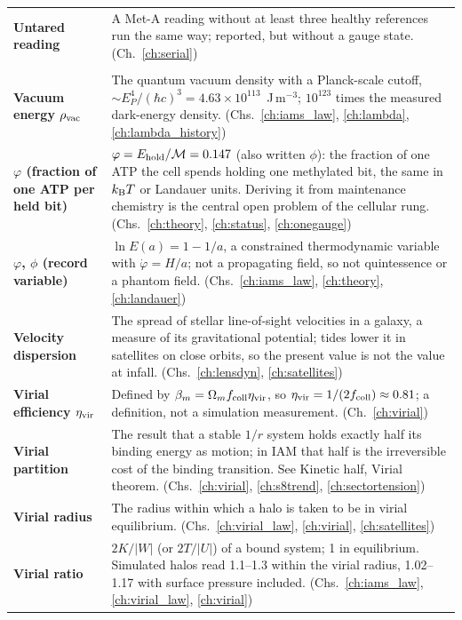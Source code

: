 {\begin{longtable}{@{}>{\raggedright\arraybackslash}p{}>{\raggedright\arraybackslash}p{}@{}}
\textbf{Untared reading} & A Met-A reading without at least three healthy references run the same way; reported, but without a gauge state. {\footnotesize(Ch.~\ref{ch:serial})}\\[1pt]
\multicolumn{2}{@{}l}{\normalsize\textbf{V}}\\[2pt]
\textbf{Vacuum energy $\rho_{\rm vac}$} & The quantum vacuum density with a Planck-scale cutoff, $\sim E_P^4/(\hbar c)^3=4.63\times10^{113}$~J\,m$^{-3}$; $10^{123}$ times the measured dark-energy density. {\footnotesize(Chs.~\ref{ch:iams_law}, \ref{ch:lambda}, \ref{ch:lambda_history})}\\[1pt]
\textbf{$\varphi$ (fraction of one ATP per held bit)} & $\varphi=E_{\rm hold}/\mathcal M=0.147$ (also written $\phi$): the fraction of one ATP the cell spends holding one methylated bit, the same in $k_{\mathrm B} T$ or Landauer units. Deriving it from maintenance chemistry is the central open problem of the cellular rung. {\footnotesize(Chs.~\ref{ch:theory}, \ref{ch:status}, \ref{ch:onegauge})}\\[1pt]
\textbf{$\varphi$, $\phi$ (record variable)} & $\ln E(a)=1-1/a$, a constrained thermodynamic variable with $\dot\varphi=H/a$; not a propagating field, so not quintessence or a phantom field. {\footnotesize(Chs.~\ref{ch:iams_law}, \ref{ch:theory}, \ref{ch:landauer})}\\[1pt]
\textbf{Velocity dispersion} & The spread of stellar line-of-sight velocities in a galaxy, a measure of its gravitational potential; tides lower it in satellites on close orbits, so the present value is not the value at infall. {\footnotesize(Chs.~\ref{ch:lensdyn}, \ref{ch:satellites})}\\[1pt]
\textbf{Virial efficiency $\eta_{\rm vir}$} & Defined by $\beta_m=\Omega_mf_{\rm coll}\eta_{\rm vir}$, so $\eta_{\rm vir}=1/(2f_{\rm coll})\approx0.81$; a definition, not a simulation measurement. {\footnotesize(Ch.~\ref{ch:virial})}\\[1pt]
\textbf{Virial partition} & The result that a stable $1/r$ system holds exactly half its binding energy as motion; in IAM that half is the irreversible cost of the binding transition. See Kinetic half, Virial theorem. {\footnotesize(Chs.~\ref{ch:virial}, \ref{ch:s8trend}, \ref{ch:sectortension})}\\[1pt]
\textbf{Virial radius} & The radius within which a halo is taken to be in virial equilibrium. {\footnotesize(Chs.~\ref{ch:virial_law}, \ref{ch:virial}, \ref{ch:satellites})}\\[1pt]
\textbf{Virial ratio} & $2K/|W|$ (or $2T/|U|$) of a bound system; 1 in equilibrium. Simulated halos read 1.1--1.3 within the virial radius, 1.02--1.17 with surface pressure included. {\footnotesize(Chs.~\ref{ch:iams_law}, \ref{ch:virial_law}, \ref{ch:virial})}\\[1pt]

\end{longtable}}
